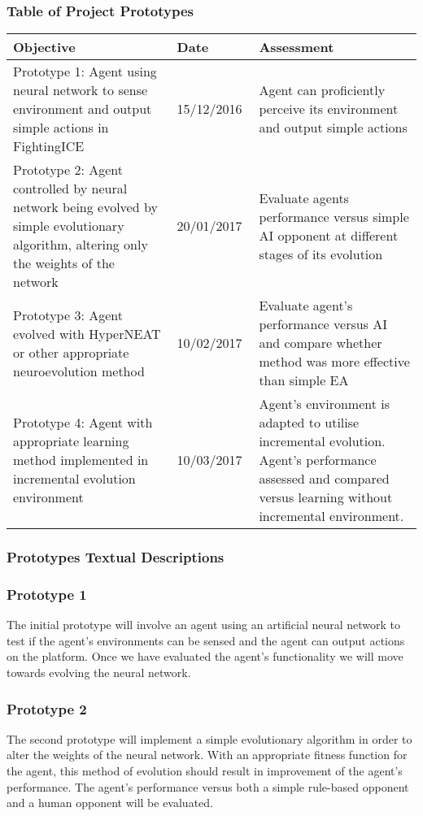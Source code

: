 \documentclass[12pt,a4paper]{article}
\begin{document}
\subsubsection{Table of Project Prototypes}
\begin{tabular}{|p{0.4\linewidth}|p{0.2\linewidth}|p{0.4\linewidth}|}
\hline
Objective & Date & Assessment\\ \hline
Prototype 1: Agent using neural network to sense environment and output simple actions in FightingICE & 15/12/2016 & Agent can proficiently perceive its environment and output simple actions\\ \hline
Prototype 2: Agent controlled by neural network being evolved by simple evolutionary algorithm, altering only the weights of the network & 20/01/2017 & Evaluate agents performance versus simple AI opponent at different stages of its evolution\\ \hline
Prototype 3: Agent evolved with HyperNEAT or other appropriate neuroevolution method & 10/02/2017 & Evaluate agent's performance versus AI and compare whether method was more effective than simple EA\\ \hline
Prototype 4: Agent with appropriate learning method implemented in incremental evolution environment & 10/03/2017 & Agent's environment is adapted to utilise incremental evolution. Agent's performance assessed and compared versus learning without incremental environment.\\ \hline
\end{tabular}
\newpage
\subsubsection{Prototypes Textual Descriptions}
\subsubsection*{Prototype 1}
The initial prototype will involve an agent using an artificial neural network to test if the agent's environments can be sensed and the agent can output actions on the platform. Once we have evaluated the agent's functionality we will move towards evolving the neural network.

\subsubsection*{Prototype 2}
The second prototype will implement a simple evolutionary algorithm in order to alter the weights of the neural network. With an appropriate fitness function for the agent, this method of evolution should result in improvement of the agent's performance. The agent's performance versus both a simple rule-based opponent and a human opponent will be evaluated.
\end{document}
